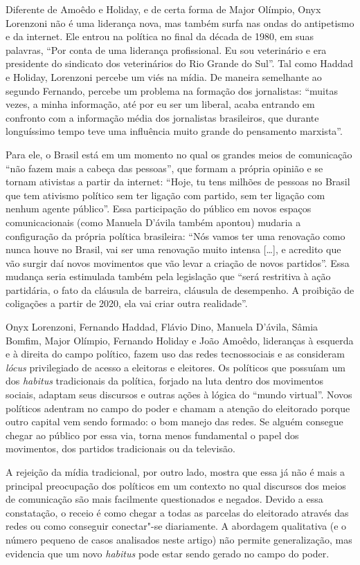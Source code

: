 Diferente de Amoêdo e Holiday, e de certa forma de Major Olímpio, Onyx
Lorenzoni não é uma liderança nova, mas também surfa nas ondas do
antipetismo e da internet. Ele entrou na política no final da década de
1980, em suas palavras, ``Por conta de uma liderança profissional. Eu
sou veterinário e era presidente do sindicato dos veterinários do Rio
Grande do Sul''. Tal como Haddad e Holiday, Lorenzoni percebe um viés na
mídia. De maneira semelhante ao segundo Fernando, percebe um problema na
formação dos jornalistas: ``muitas vezes, a minha informação, até por eu
ser um liberal, acaba entrando em confronto com a informação média dos
jornalistas brasileiros, que durante longuíssimo tempo teve uma
influência muito grande do pensamento marxista''.

Para ele, o Brasil está em um momento no qual os grandes meios de
comunicação ``não fazem mais a cabeça das pessoas'', que formam a
própria opinião e se tornam ativistas a partir da internet: ``Hoje, tu
tens milhões de pessoas no Brasil que tem ativismo político sem ter
ligação com partido, sem ter ligação com nenhum agente público''. Essa
participação do público em novos espaços comunicacionais (como Manuela
D'ávila também apontou) mudaria a configuração da própria política
brasileira: ``Nós vamos ter uma renovação como nunca houve no Brasil,
vai ser uma renovação muito intensa {[}\ldots{}{]}, e acredito que vão surgir
daí novos movimentos que vão levar a criação de novos partidos''. Essa
mudança seria estimulada também pela legislação que ``será restritiva à
ação partidária, o fato da cláusula de barreira, cláusula de desempenho.
A proibição de coligações a partir de 2020, ela vai criar outra
realidade''.

Onyx Lorenzoni, Fernando Haddad, Flávio Dino, Manuela D'ávila, Sâmia
Bomfim, Major Olímpio, Fernando Holiday e João Amoêdo, lideranças à
esquerda e à direita do campo político, fazem uso das redes
tecnossociais e as consideram \emph{lócus} privilegiado de acesso a
eleitoras e eleitores. Os políticos que possuíam um dos \emph{habitus}
tradicionais da política, forjado na luta dentro dos movimentos sociais,
adaptam seus discursos e outras ações à lógica do ``mundo virtual''.
Novos políticos adentram no campo do poder e chamam a atenção do
eleitorado porque outro capital vem sendo formado: o bom manejo das
redes. Se alguém consegue chegar ao público por essa via, torna menos
fundamental o papel dos movimentos, dos partidos tradicionais ou da
televisão.

A rejeição da mídia tradicional, por outro lado, mostra que essa já não
é mais a principal preocupação dos políticos em um contexto no qual
discursos dos meios de comunicação são mais facilmente questionados e
negados. Devido a essa constatação, o receio é como chegar a todas as
parcelas do eleitorado através das redes ou como conseguir conectar"-se
diariamente. A abordagem qualitativa (e o número pequeno de casos
analisados neste artigo) não permite generalização, mas evidencia que um
novo \emph{habitus} pode estar sendo gerado no campo do poder.

